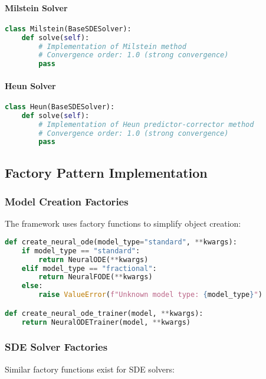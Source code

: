 \paragraph{Milstein Solver}
\begin{lstlisting}[language=Python, caption=Milstein Implementation]
class Milstein(BaseSDESolver):
    def solve(self):
        # Implementation of Milstein method
        # Convergence order: 1.0 (strong convergence)
        pass
\end{lstlisting}

\paragraph{Heun Solver}
\begin{lstlisting}[language=Python, caption=Heun Implementation]
class Heun(BaseSDESolver):
    def solve(self):
        # Implementation of Heun predictor-corrector method
        # Convergence order: 1.0 (strong convergence)
        pass
\end{lstlisting}

\subsection{Factory Pattern Implementation}

\subsubsection{Model Creation Factories}

The framework uses factory functions to simplify object creation:

\begin{lstlisting}[language=Python, caption=Neural ODE Factory Functions]
def create_neural_ode(model_type="standard", **kwargs):
    if model_type == "standard":
        return NeuralODE(**kwargs)
    elif model_type == "fractional":
        return NeuralFODE(**kwargs)
    else:
        raise ValueError(f"Unknown model type: {model_type}")

def create_neural_ode_trainer(model, **kwargs):
    return NeuralODETrainer(model, **kwargs)
\end{lstlisting}

\subsubsection{SDE Solver Factories}

Similar factory functions exist for SDE solvers:

